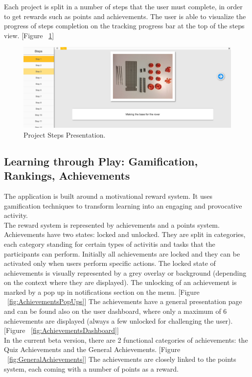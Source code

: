 Each project is split in a number of steps that the user must complete, in order to get rewards such as points and achievements. The user is able to visualize the progress of steps completion on the tracking progress bar at the top of the steps view. [Figure ~\ref{fig:project_steps}] 

\begin{figure}
\includegraphics[width=1\linewidth]{images/ui/ProjectSteps.png}
\caption{Project Steps Presentation.}
\label{fig:project_steps}
\end{figure}


\subsection{Learning through Play: Gamification, Rankings, Achievements}

The application is built around a motivational reward system. It uses gamification techniques to transform learning into an engaging and provocative activity. \\

The reward system is represented by achievements and a points system. Achievements have two states: locked and unlocked. They are split in categories, each category standing for certain types of activitis and tasks that the participants can perform. Initially all achievements are locked and they can be activated only when users perform specific actions. The locked state of achievements is visually represented by a grey overlay or background (depending on the context where they are displayed). The unlocking of an achievement is marked by a pop up in notifications section on the menu. [Figure ~\ref{fig:AchievementsPopUps}] The achievements have a general presentation page and can be found also on the user dashboard, where only a maximum of 6 achievements are displayed (always a few unlocked for challenging the user). [Figure ~\ref{fig:AchievementsDashboard}] \\

In the current beta version, there are 2 functional categories of achievements: the Quiz Achievements and the General Achievements. [Figure ~\ref{fig:GeneralAchievements}] The achievements are closely linked to the points system, each coming with a number of points as a reward.\\

